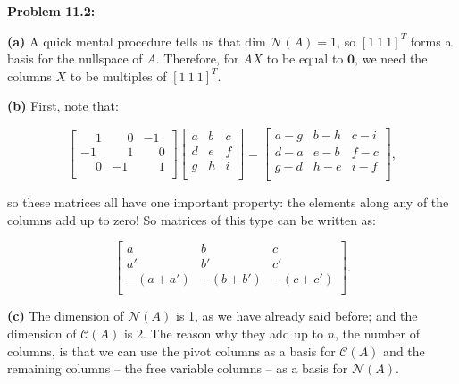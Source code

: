 \documentclass{article}
\begin{document}
\noindent \textbf{Problem 11.2:}

\noindent \textbf{(a)} A quick mental procedure tells us that $\text{dim }\mathcal{N}(A) = 1$, so $[1 \ 1 \ 1]^{T}$ forms a basis for the nullspace of $A$. Therefore, for $AX$ to be equal to $\mathbf{0}$, we need the columns $X$ to be multiples of $[1 \ 1 \ 1]^{T}$.

\noindent \textbf{(b)} First, note that:

\[
\begin{bmatrix}
\phantom{-}1 & \phantom{-}0 & -1\\
-1 & \phantom{-}1 & \phantom{-}0\\
\phantom{-}0 & -1 & \phantom{-}1\\
\end{bmatrix}
\begin{bmatrix}
a & b & c\\
d & e & f\\
g & h & i\\
\end{bmatrix}
=
\begin{bmatrix}
a - g & b - h & c - i\\
d - a & e - b & f - c\\
g - d & h - e & i - f\\
\end{bmatrix},
\]

so these matrices all have one important property: the elements along any of the columns add up to zero! So matrices of this type can be written as:

\[
\begin{bmatrix}
a & b & c\\
a' & b' & c'\\
-(a + a') & -(b + b') & -(c + c')\\
\end{bmatrix}.
\]

\noindent \textbf{(c)} The dimension of $\mathcal{N}(A)$ is 1, as we have already said before; and the dimension of $\mathcal{C}(A)$ is 2. The reason why they add up to $n$, the number of columns, is that we can use the pivot columns as a basis for $\mathcal{C}(A)$ and the remaining columns -- the free variable columns -- as a basis for $\mathcal{N}(A)$.
\end{document}
